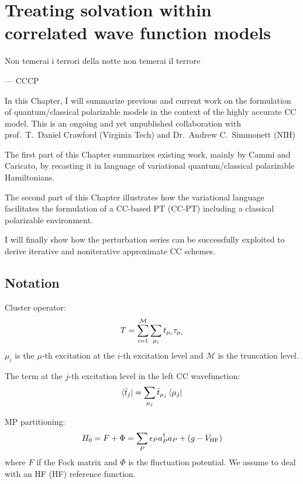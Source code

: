 \chapter{Treating solvation within correlated wave function models}\label{ch:PCMCC}

\epigraph{Non temerai i terrori della notte non temerai il terrore}{--- \textsc{CCCP}}

In this Chapter, I will summarize previous and current work on the
formulation of quantum/classical polarizable models in the context of
the highly accurate \acl{CC} model.
This is an ongoing and yet unpublished collaboration with prof.~T.~Daniel Crawford
(Virginia Tech) and Dr.~Andrew C.~Simmonett (NIH)

The first part of this Chapter summarizes existing work, mainly by Cammi
and Caricato, by recasting it in language of variational
quantum/classical polarizable Hamiltonians.

The second part of this Chapter illustrates how the variational language
facilitates the formulation of a \acl{CC}-based \acl{PT} (\acs{CC}-\acs{PT})
including a classical polarizable environment.

I will finally show how the perturbation series can be successfully
exploited to derive iterative and noniterative approximate \acs{CC}
schemes.

\pagebreak

\section{Notation}
Cluster operator:
\begin{equation}
  T = \sum_{i=1}^\mathcal{M}\sum_{\mu_i}t_{\mu_i}\tau_{\mu_i}
\end{equation}
$\mu_i$ is the $\mu$-th excitation at the $i$-th
excitation level and $\mathcal{M}$ is the truncation level.

The term at the $j$-th excitation level in the left CC wavefunction:
\begin{equation}
  \bra{\bar{t}_{j}} = \sum_{\mu_j}\bar{t}_{\mu_j}\bra{\mu_j}
\end{equation}

\acl{MP} partitioning:
\begin{equation}
 H_0 = F + \Phi = \sum_P\epsilon_Pa_{P}^{\dagger}a_{P} + (g- V_\mathrm{HF})
\end{equation}
where $F$ if the Fock matrix and $\Phi$ is the fluctuation potential.
We assume to deal with an \acl{HF} (\acs{HF}) reference function.

